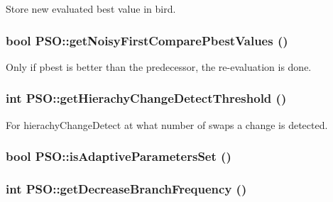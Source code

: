 Store new evaluated best value in bird. 

\hypertarget{classPSO_21328296d8a9c44a0cbef8f4f32d632e}{
\subsubsection{\setlength{\rightskip}{0pt plus 5cm}bool PSO::getNoisyFirstComparePbestValues ()}}
\label{classPSO_21328296d8a9c44a0cbef8f4f32d632e}


Only if pbest is better than the predecessor, the re-evaluation is done. 

\hypertarget{classPSO_9f0b500a00467d6a2332f2094d585245}{
\subsubsection{\setlength{\rightskip}{0pt plus 5cm}int PSO::getHierachyChangeDetectThreshold ()}}
\label{classPSO_9f0b500a00467d6a2332f2094d585245}


For hierachyChangeDetect at what number of swaps a change is detected. 

\hypertarget{classPSO_91e7ffe95b7867a0bbff7a39cf859961}{
\subsubsection{\setlength{\rightskip}{0pt plus 5cm}bool PSO::isAdaptiveParametersSet ()}}
\label{classPSO_91e7ffe95b7867a0bbff7a39cf859961}


\hypertarget{classPSO_f6b5c807ceeeafc2110b7b4aa2f27242}{
\subsubsection{\setlength{\rightskip}{0pt plus 5cm}int PSO::getDecreaseBranchFrequency ()}}
\label{classPSO_f6b5c807ceeeafc2110b7b4aa2f27242}


